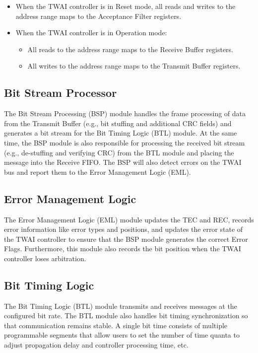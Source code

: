 \documentclass[main\_\_EN.tex]{subfiles}
\begin{document}
\begin{itemize}
    \item When the TWAI controller is in Reset mode, all reads and writes to the address range maps to the Acceptance Filter registers.
    \item When the TWAI controller is in Operation mode:
    \begin{itemize}
        \item All reads to the address range maps to the Receive Buffer registers.
        \item All writes to the address range maps to the Transmit Buffer registers.
    \end{itemize}
\end{itemize}

\subsection{Bit Stream Processor}
The Bit Stream Processing (BSP) module handles the frame processing of data from the Transmit Buffer (e.g., bit stuffing and additional CRC fields) and generates a bit stream for the Bit Timing Logic (BTL) module. At the same time, the BSP module is also responsible for processing the received bit stream (e.g., de-stuffing and verifying CRC) from the BTL module and placing the message into the Receive FIFO. The BSP will also detect errors on the TWAI bus and report them to the Error Management Logic (EML).

\subsection{Error Management Logic}
The Error Management Logic (EML) module updates the TEC and REC, records error information like error types and positions, and updates the error state of the TWAI controller to ensure that the BSP module generates the correct Error Flags. Furthermore, this module also records the bit position when the TWAI controller loses arbitration.

\subsection{Bit Timing Logic}
The Bit Timing Logic (BTL) module transmits and receives messages at the configured bit rate. The BTL module also handles bit timing synchronization so that communication remains stable. A single bit time consists of multiple programmable segments that allow users to set the number of time quanta to adjust propagation delay and controller processing time, etc.
\end{document}
